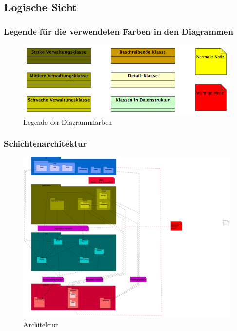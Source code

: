 \documentclass[a4paper,12pt,halfparskip,DIV14]{scrartcl}
\begin{document}
\subsection{Logische Sicht} %
\label{sub:logische_schicht}

\subsubsection{Legende für die verwendeten Farben in den Diagrammen} %
\label{ssub:legende_fuer_die_verwendeten_farben_in_den_diagrammen}
\begin{figure}
	[htp] \centering 
	\includegraphics[width=1\textwidth]{legende.png} \caption{Legende der Diagrammfarben}\label{fig:legende.png} 
\end{figure}

\subsubsection{Schichtenarchitektur} %
\label{sub:schichtenarchitektur}
\begin{figure}
	[htp] \centering 
	\includegraphics[width=1\textwidth]{Architektur.png} \caption{Architektur}\label{fig:Architektur.png} 
\end{figure}
\end{document}
